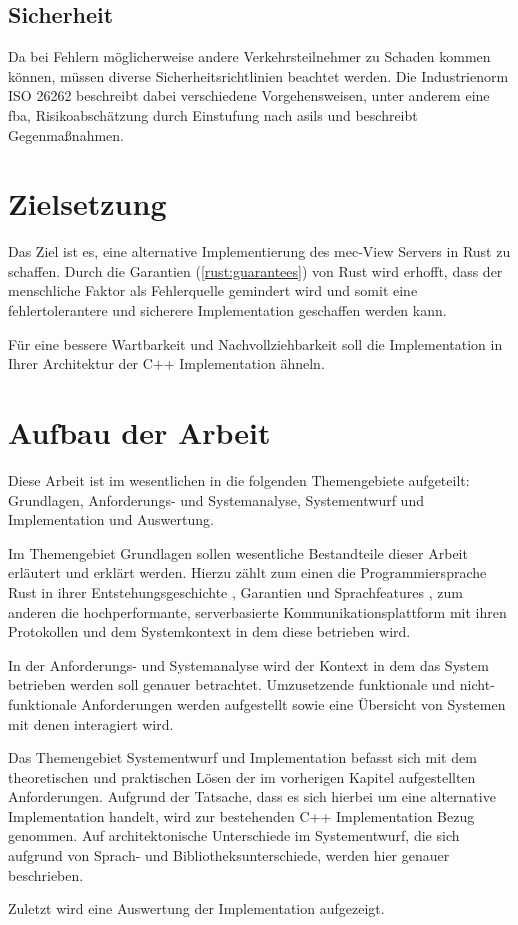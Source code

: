 \subsection{Sicherheit}
Da bei Fehlern möglicherweise andere Verkehrsteilnehmer zu Schaden kommen können, müssen diverse Sicherheitsrichtlinien beachtet werden. Die Industrienorm ISO 26262 beschreibt dabei verschiedene Vorgehensweisen,
unter anderem eine \gls{fba}, Risikoabschätzung durch Einstufung nach \glspl{asil} und beschreibt Gegenmaßnahmen.


\section{Zielsetzung}

Das Ziel ist es, eine alternative Implementierung des \gls{mec}-View Servers in Rust zu schaffen.
Durch die Garantien (\autoref{rust:guarantees}) von Rust wird erhofft, dass der menschliche Faktor als Fehlerquelle gemindert wird und somit eine fehlertolerantere und sicherere Implementation geschaffen werden kann.

 Für eine bessere Wartbarkeit und Nachvollziehbarkeit soll die Implementation in Ihrer Architektur der C++ Implementation ähneln.


\section{Aufbau der Arbeit}

Diese Arbeit ist im wesentlichen in die folgenden Themengebiete aufgeteilt: Grundlagen, Anforderungs- und Systemanalyse, Systementwurf und Implementation und Auswertung.

Im Themengebiet Grundlagen sollen wesentliche Bestandteile dieser Arbeit erläutert und erklärt werden.
Hierzu zählt zum einen die Programmiersprache Rust in ihrer Entstehungsgeschichte , Garantien   und Sprachfeatures , zum anderen die hochperformante, serverbasierte Kommunikationsplattform mit ihren Protokollen  und dem Systemkontext in dem diese betrieben wird.

In der Anforderungs- und Systemanalyse wird der Kontext in dem das System betrieben werden soll genauer betrachtet. Umzusetzende funktionale und nicht-funktionale Anforderungen werden aufgestellt sowie eine Übersicht von Systemen mit denen interagiert wird.

Das Themengebiet Systementwurf und Implementation befasst sich mit dem theoretischen und praktischen Lösen der im vorherigen Kapitel aufgestellten Anforderungen. Aufgrund der Tatsache, dass es sich hierbei
um eine alternative Implementation handelt, wird zur bestehenden C++ Implementation Bezug genommen.
Auf architektonische Unterschiede im Systementwurf, die sich aufgrund von Sprach- und Bibliotheksunterschiede, werden hier genauer beschrieben.

Zuletzt wird eine Auswertung der Implementation aufgezeigt. 